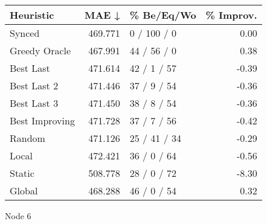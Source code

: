 \begin{tabular}{lrlr}
\toprule
\textbf{Heuristic} & \textbf{MAE ↓} & \textbf{\% Be/Eq/Wo} & \textbf{\% Improv.} \\
\midrule
            Synced &        469.771 &          0 / 100 / 0 &                0.00 \\
     Greedy Oracle &        467.991 &          44 / 56 / 0 &                0.38 \\
         Best Last &        471.614 &          42 / 1 / 57 &               -0.39 \\
       Best Last 2 &        471.446 &          37 / 9 / 54 &               -0.36 \\
       Best Last 3 &        471.450 &          38 / 8 / 54 &               -0.36 \\
    Best Improving &        471.728 &          37 / 7 / 56 &               -0.42 \\
            Random &        471.126 &         25 / 41 / 34 &               -0.29 \\
             Local &        472.421 &          36 / 0 / 64 &               -0.56 \\
            Static &        508.778 &          28 / 0 / 72 &               -8.30 \\
            Global &        468.288 &          46 / 0 / 54 &                0.32 \\
\bottomrule
\end{tabular}
\caption{Node 6}
\label{tab:iid_lr05_le1_bs4_6}
